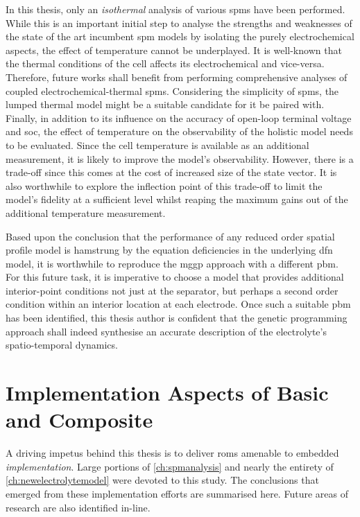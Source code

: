In this thesis,  only an \emph{isothermal} analysis of  various \glspl{spm} have
been performed. While this is an important initial step to analyse the strengths
and weaknesses of  the state of the art incumbent  \gls{spm} models by isolating
the  purely  electrochemical  aspects,  the  effect  of  temperature  cannot  be
underplayed. It  is well-known that the  thermal conditions of the  cell affects
its  electrochemical  and  vice-versa.  Therefore, future  works  shall  benefit
from  performing  comprehensive   analyses  of  coupled  electrochemical-thermal
\glspl{spm}. Considering the simplicity of \glspl{spm}, the lumped thermal model
might be a suitable candidate for it be paired with. Finally, in addition to its
influence  on the  accuracy of  open-loop  terminal voltage  and \gls{soc},  the
effect of  temperature on the  observability of the  holistic model needs  to be
evaluated. Since the cell temperature is available as an additional measurement,
it is likely to improve the model's observability. However, there is a trade-off
since this comes at  the cost of increased size of the state  vector. It is also
worthwhile  to explore  the  inflection point  of this  trade-off  to limit  the
model's fidelity at  a sufficient level whilst reaping the  maximum gains out of
the additional temperature measurement.

Based upon the conclusion that the performance of any reduced order spatial
profile model is hamstrung by the equation deficiencies in the underlying
\gls{dfn} model, it is worthwhile to reproduce the \gls{mggp} approach with a
different \gls{pbm}. For this future task, it is imperative to choose a model
that provides additional interior-point conditions \ie{} not just at the
separator, but perhaps a second order condition within an interior location at
each electrode. Once such a suitable \gls{pbm} has been identified, this thesis
author is confident that the genetic programming approach shall indeed
synthesise an accurate description of the electrolyte's spatio-temporal
dynamics.

\section{Implementation Aspects of Basic and Composite }

A driving impetus behind this thesis is to deliver \glspl{rom} amenable  to
embedded \emph{implementation}. Large portions of \cref{ch:spmanalysis} and
nearly the entirety of \cref{ch:newelectrolytemodel} were devoted to this study.
The conclusions that emerged from these implementation efforts are summarised
here. Future areas of research are also identified in-line.

